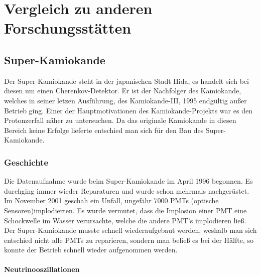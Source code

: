 \chapter{Vergleich zu anderen Forschungsstätten} 
\vspace{8pt}

\section{Super-Kamiokande}

Der Super-Kamiokande steht in der japanischen Stadt Hida, es handelt sich bei diesen um einen
Cherenkov-Detektor. Er ist der Nachfolger des Kamiokande, welches in seiner letzen Ausführung,
des Kamiokande-III, 1995 endgültig außer Betrieb ging.
Einer der Hauptmotivationen des Kamiokande-Projekts war es den Protonzerfall näher zu untersuchen. 
Da das originale Kamiokande in diesen Bereich keine Erfolge lieferte entschied man sich für 
den Bau des Super-Kamiokande. \cite{Fukanda2003}

\subsection{Geschichte}

Die Datenaufnahme wurde beim Super-Kamiokande im April 1996 begonnen. Es durchging immer wieder 
Reparaturen und wurde schon mehrmals nachgerüstet. \cite{Fukanda2003} Im November 2001 
geschah ein Unfall, ungefähr 7000 PMTs (optische Sensoren)implodierten. Es wurde vermutet, 
dass die Implosion einer PMT eine Schockwelle im Wasser verursachte, welche die andere PMT's
implodieren ließ. Der Super-Kamiokande musste schnell wiederaufgebaut werden, weshalb man sich 
entschied nicht alle PMTs zu reparieren, sondern man beließ es bei der Hälfte, so konnte der 
Betrieb schnell wieder aufgenommen werden. \cite{Cartlidge2001}

\subsubsection{Neutrinooszillationen}

